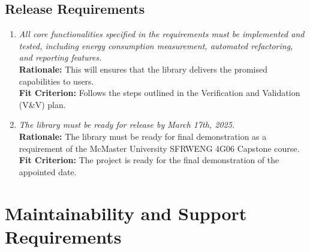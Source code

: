\documentclass[12pt]{article}
\begin{document}
\subsection{Release Requirements}
\begin{enumerate}[label=OER-RL \arabic*., wide=0pt, leftmargin=*]
	\item \emph{All core functionalities specified in the requirements must be implemented and tested, including energy consumption measurement, automated refactoring, and reporting features.}\\
    {\bf Rationale:} This will ensures that the library delivers the promised capabilities to users.\\
    {\bf Fit Criterion:} Follows the steps outlined in the Verification and Validation (V\&V) plan.  
  \item \emph{The library must be ready for release by March 17th, 2025.}\\
    {\bf Rationale:} The library must be ready for final demonstration as a requirement of the McMaster University SFRWENG 4G06 Capstone course.\\
    {\bf Fit Criterion:} The project is ready for the final demonstration of the appointed date.
\end{enumerate}

\section{Maintainability and Support Requirements}
\end{document}
